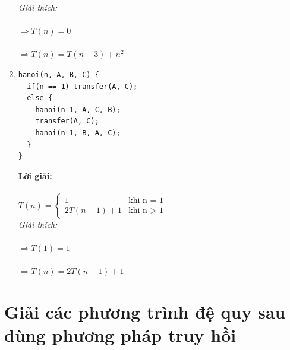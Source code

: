 \documentclass[12pt, letterpaper]{article}
\begin{document}
\begin{enumerate}
  \textit{Giải thích:} \\
   \\
  $\Rightarrow T(n) = 0$ \\
   \\
  $\Rightarrow T(n) = T(n-3) + n^2$ \\

	\item \begin{lstlisting}
hanoi(n, A, B, C) {
  if(n == 1) transfer(A, C);
  else {
    hanoi(n-1, A, C, B);
    transfer(A, C);
    hanoi(n-1, B, A, C);
  }
}
  \end{lstlisting}

  \textbf{Lời giải:} \\ \\
  $T(n) =
  \begin{cases}
  1 &\text{khi n = 1} \\
  2T(n-1) + 1 &\text{khi n > 1}
  \end{cases}$ \\

  \textit{Giải thích:} \\
   \\
  $\Rightarrow T(1) = 1$ \\
   \\
  $\Rightarrow T(n) = 2T(n-1) + 1$ \\

\end{enumerate}
\section{Giải các phương trình đệ quy sau dùng phương pháp truy hồi}
\end{document}
